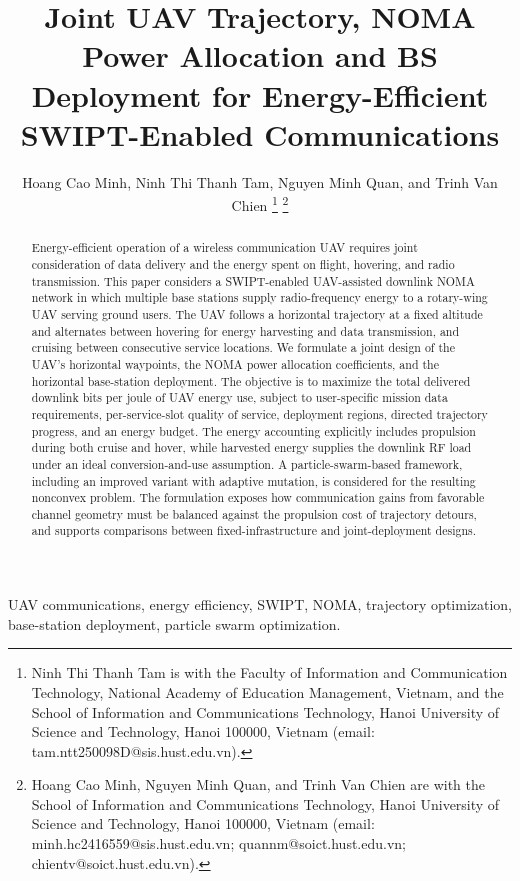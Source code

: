 \documentclass[conference]{IEEEtran}
\begin{document}
\title{Joint UAV Trajectory, NOMA Power Allocation and BS Deployment for Energy-Efficient SWIPT-Enabled Communications}
\author{Hoang Cao Minh, Ninh Thi Thanh Tam, Nguyen Minh Quan, and Trinh Van Chien
\thanks{Ninh Thi Thanh Tam is with the Faculty of Information and Communication Technology, National Academy of Education Management, Vietnam, and the School of Information and Communications Technology, Hanoi University of Science and Technology, Hanoi 100000, Vietnam (email: tam.ntt250098D@sis.hust.edu.vn).}
\thanks{Hoang Cao Minh, Nguyen Minh Quan, and Trinh Van Chien are with the School of Information and Communications Technology, Hanoi University of Science and Technology, Hanoi 100000, Vietnam (email: minh.hc2416559@sis.hust.edu.vn; quannm@soict.hust.edu.vn; chientv@soict.hust.edu.vn).}}
\maketitle
\thispagestyle{plain}

\begin{abstract}
Energy-efficient operation of a wireless communication UAV requires joint consideration of data delivery and the energy spent on flight, hovering, and radio transmission. This paper considers a SWIPT-enabled UAV-assisted downlink NOMA network in which multiple base stations supply radio-frequency energy to a rotary-wing UAV serving ground users. The UAV follows a horizontal trajectory at a fixed altitude and alternates between hovering for energy harvesting and data transmission, and cruising between consecutive service locations. We formulate a joint design of the UAV's horizontal waypoints, the NOMA power allocation coefficients, and the horizontal base-station deployment. The objective is to maximize the total delivered downlink bits per joule of UAV energy use, subject to user-specific mission data requirements, per-service-slot quality of service, deployment regions, directed trajectory progress, and an energy budget. The energy accounting explicitly includes propulsion during both cruise and hover, while harvested energy supplies the downlink RF load under an ideal conversion-and-use assumption. A particle-swarm-based framework, including an improved variant with adaptive mutation, is considered for the resulting nonconvex problem. The formulation exposes how communication gains from favorable channel geometry must be balanced against the propulsion cost of trajectory detours, and supports comparisons between fixed-infrastructure and joint-deployment designs.
\end{abstract}
\begin{IEEEkeywords}
UAV communications, energy efficiency, SWIPT, NOMA, trajectory optimization, base-station deployment, particle swarm optimization.
\end{IEEEkeywords}
\end{document}
